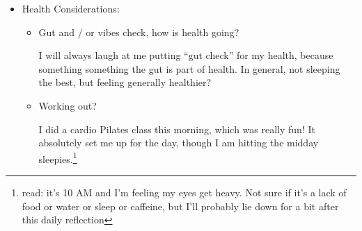 \documentclass[12pt]{article}
\newcommand{\say}[1]{``#1''}
\renewcommand{\,}{\textsuperscript{,}}
\begin{document}
\begin{itemize}
\begin{itemize}
\begin{itemize}
\end{itemize}

\item Outreach:

\begin{itemize}

\item How's outreach going?

Nonexistent.

\item How goes prep for the rest of your life?

Nonexistent. Planning to write up a thing I can send to libraries and whatnot about what I can do, though.

\item How goes prep / submission of workshops?

Added to the fungenda.

\item Any talks coming?

Sadly no :(.

\item Upon reflection, how goes outreach? Anything missed in those three questions?

Nonexistent right now, but I'm getting back into thinking about it, at least.

\end{itemize}

\item Upon reflection, how is creation going?

About what I thought! That's kinda nice, not going to lie.

\end{itemize}

\item Health Considerations:

\begin{itemize}

\item Gut and / or vibes check, how is health going?

I will always laugh at me putting \say{gut check} for my health, because something something the gut is part of health.  
In general, not sleeping the best, but feeling generally healthier?

\item Working out?

I did a cardio Pilates class this morning, which was really fun! It absolutely set me up for the day, though I am hitting the midday sleepies.\footnote{read: it's 10 AM and I'm feeling my eyes get heavy. Not sure if it's a lack of food or water or sleep or caffeine, but I'll probably lie down for a bit after this daily reflection}


\end{itemize}
\end{itemize}
\end{document}
